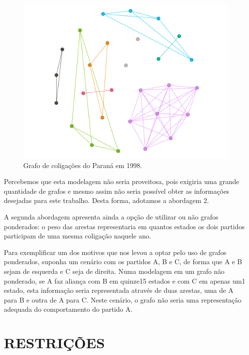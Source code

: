 \begin{figure}[H]
\centering
\includegraphics[width=1\textwidth]{img/parana-1998.png}
\caption{Grafo de coligações do Paraná em 1998.}
\label{grafo-parana-1998}
\end{figure}

Percebemos que esta modelagem não seria proveitosa, pois exigiria uma grande quantidade de grafos e mesmo assim não seria possível obter as informações desejadas para este trabalho. Desta forma, adotamos a abordagem 2.

A segunda abordagem apresenta ainda a opção de utilizar ou não grafos ponderados: o peso das arestas representaria em quantos estados os dois partidos participam de uma mesma coligação naquele ano.

Para exemplificar um dos motivos que nos levou a optar pelo uso de grafos ponderados, suponha um cenário com os partidos A, B e C, de forma que A e B sejam de esquerda e C seja de direita. Numa modelagem em um grafo não ponderado, se A faz aliança com B em quinze15 estados e com C em apenas um1 estado, esta informação seria representada através de duas arestas, uma de A para B e outra de A para C. Neste cenário, o grafo não seria uma representação adequada do comportamento do partido A.

\section{\texorpdfstring{\MakeUppercase{Restrições}}{}}
\label{proposta__restricoes}

